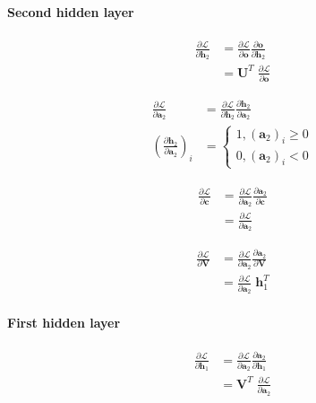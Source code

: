 \documentclass{article}
\numberwithin{equation}{section}
\begin{document}
\paragraph{Second hidden layer}
\begin{equation}
\begin{split}
	\frac{\partial\mathcal{L}}{\partial\bm{h}_2}
		&= \frac{\partial\mathcal{L}}{\partial\bm{o}} \frac{\partial\bm{o}}{\partial\bm{h}_2} \\
		&= \bm{U}^T\; \frac{\partial\mathcal{L}}{\partial\bm{o}}
\end{split}
\end{equation}

\begin{equation}
\begin{split}
	\frac{\partial\mathcal{L}}{\partial\bm{a}_2}
		&= \frac{\partial\mathcal{L}}{\partial\bm{h}_2} \frac{\partial\bm{h}_2}{\partial\bm{a}_2} \\
	\left(\frac{\partial\bm{h}_2}{\partial\bm{a}_2}\right)_i
		&= \left\{\begin{matrix}
			1, (\bm{a}_2)_i \geq 0 \\
			0, (\bm{a}_2)_i < 0
			\end{matrix}\right.
\end{split}
\end{equation}

\begin{equation}
\begin{split}
	\frac{\partial\mathcal{L}}{\partial\bm{c}}
		&= \frac{\partial\mathcal{L}}{\partial\bm{a}_2} \frac{\partial\bm{a}_2}{\partial\bm{c}} \\
		&= \frac{\partial\mathcal{L}}{\partial\bm{a}_2}
\end{split}
\end{equation}

\begin{equation}
\begin{split}
	\frac{\partial\mathcal{L}}{\partial\bm{V}}
		&= \frac{\partial\mathcal{L}}{\partial\bm{a}_2} \frac{\partial\bm{a}_2}{\partial\bm{V}} \\
		&= \frac{\partial\mathcal{L}}{\partial\bm{a}_2} \;\bm{h}_1^T
\end{split}
\end{equation}

\paragraph{First hidden layer}
\begin{equation}
\begin{split}
	\frac{\partial\mathcal{L}}{\partial\bm{h}_1}
		&= \frac{\partial\mathcal{L}}{\partial\bm{a}_2} \frac{\partial\bm{a}_2}{\partial\bm{h}_1} \\
		&= \bm{V}^T\; \frac{\partial\mathcal{L}}{\partial\bm{a}_2}
\end{split}
\end{equation}
\end{document}
